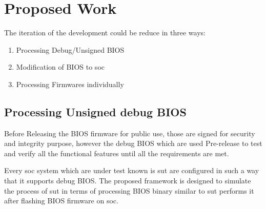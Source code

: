 \section{Proposed Work}\label{section-proposed-work}
The iteration of the development could be reduce in three ways:
\begin{enumerate}
    \item Processing Debug/Unsigned BIOS
    \item Modification of BIOS to \gls{soc}
    \item Processing Firmwares individually
\end{enumerate}

\subsection{Processing Unsigned debug BIOS}
Before Releasing the BIOS firmware for public use, those are signed for security and integrity purpose, however the debug BIOS which are used Pre-release to test and verify all the functional features until all the requirements are met.

Every \gls{soc} system which are under test known is \gls{sut} are configured in such a way that it supports debug BIOS. The proposed framework is designed to simulate the process of \gls{sut} in terms of processing BIOS binary similar to \gls{sut} performs it after flashing BIOS firmware on \gls{soc}.
